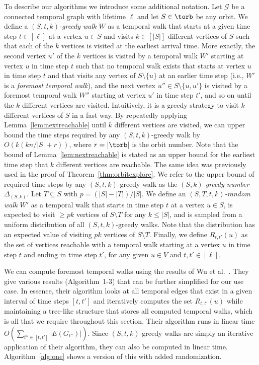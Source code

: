 {To describe our algorithms we introduce some additional notation. Let
$\mathcal{G}$ be a connected temporal graph with lifetime $\ell$ and let $S \in
\torb$ be any orbit.  We define a
\emph{$(S, t, k)$-greedy walk $W$} as a temporal walk that starts at a given
time step {$t \in [\ell]$} at a vertex $u \in S$ and visits {$k \in [|S|]$} different vertices of
{$S$ such that each of the $k$ vertices is visited at the earliest
arrival time. More exactly, the second vertex $u'$} of the $k$ vertices is visited
by a temporal walk $W'$ starting at vertex $u$ in time step $t$ such that no
temporal walk exists that starts at vertex $u$ in time step $t$ and that visits
any vertex of $S \setminus \{u\}$ at an earlier time step (i.e., $W'$ is a {\em
foremost temporal walk}), and the next vertex $u'' \in S \setminus \{u, u'\}$ is
visited by a foremost temporal walk $W''$ starting at vertex $u'$ in time step
$t'$, and so on until the $k$ different vertices are visited. Intuitively, it is
a greedy strategy to visit $k$ different vertices of $S$ in a fast way. By
repeatedly applying Lemma~\ref{lem:nextreachable} until $k$ different vertices
are visited, we can upper bound the time steps required by any $(S, t,
k)$-greedy walk by $O(k(k n/|S| + r))$, where $r=|\torb|$ is the orbit number. 
{Note that the bound of Lemma~\ref{lem:nextreachable} is stated
as an upper bound for the earliest time step that $k$ different vertices are
reachable. The same idea}
was previously used in the proof of Theorem~\ref{thm:orbitexplore}. 
%
We refer to the upper bound of required time steps by any $(S, t, k)$-greedy walk
as the \emph{$(S, k)$-greedy number $\Delta_{(S, k)}$}. 
{Let $T \subseteq S$ with $p=(|S|-|T|)/|S|$.}
We define an
\emph{$(S, T, t, k)$-random walk $W'$} as a temporal walk that starts in time
step $t$ at a vertex $u \in S$, is expected to visit $\geq p k$ vertices of $S
\setminus T$ for any $k \leq |S|$, and is sampled from a
uniform distribution of all $(S, t, k)$-greedy walks. Note that the distribution has
an expected value of visiting $p k$ vertices of $S \setminus T$. Finally, we
define $R_{t, t'}(u)$ as the set of vertices reachable with a temporal walk
starting at a {vertex $u$} in time step $t$ and ending in time step $t'$,
for any given {$u \in V$  and} $t, t' \in [\ell]$.

We can compute foremost temporal walks using the results of Wu et
al.~\cite{WuCYSYW16}. They give various results (Algorithm~1-3) that can be
further simplified for our use case. In essence, their algorithm looks at all
temporal edges that exist in a given interval of time steps $[t, t']$ and
iteratively computes the set $R_{t, t'}(u)$ while maintaining a tree-like
structure that stores all computed temporal walks, which is all that we require
throughout this section. Their algorithm runs in linear time $O(\sum_{t'' \in
[t, t']} |E(G_{t''})|)$. Since $(S, t, k)$-greedy walks are simply an iterative
application of {their} algorithm, they can also be computed in linear time.
Algorithm~\ref{alg:one} shows a version of this with added randomization.

}
